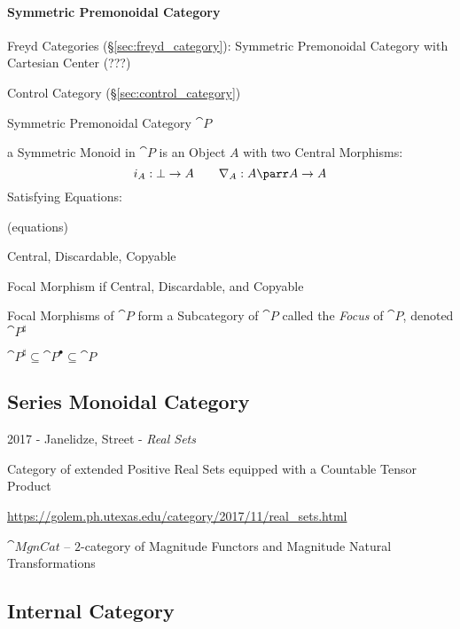\paragraph{Symmetric Premonoidal Category}
\label{sec:symmetric_premonoidal} \hfill

Freyd Categories (\S\ref{sec:freyd_category}): Symmetric Premonoidal
Category with Cartesian Center (???)

Control Category (\S\ref{sec:control_category})

Symmetric Premonoidal Category $\cat{P}$

a Symmetric Monoid in $\cat{P}$ is an Object $A$ with two Central
Morphisms:
\[
  i_A : \bot \rightarrow A \quad\quad
  \nabla_A : A \parr A \rightarrow A
\]
Satisfying Equations:

(equations) %

Central, Discardable, Copyable

Focal Morphism if Central, Discardable, and Copyable

Focal Morphisms of $\cat{P}$ form a Subcategory of $\cat{P}$ called
the \emph{Focus} of $\cat{P}$, denoted $\cat{P}^\sharp$

$\cat{P}^\sharp \subseteq \cat{P}^\bullet \subseteq \cat{P}$



\subsection{Series Monoidal Category}\label{sec:series_meonoidal_category}


2017 - Janelidze, Street - \emph{Real Sets}

Category of extended Positive Real Sets equipped with a Countable Tensor
Product

\url{https://golem.ph.utexas.edu/category/2017/11/real_sets.html}

$\cat{MgnCat}$ -- $2$-category of Magnitude Functors and Magnitude Natural
Transformations



\subsection{Internal Category}\label{sec:internal_category}

